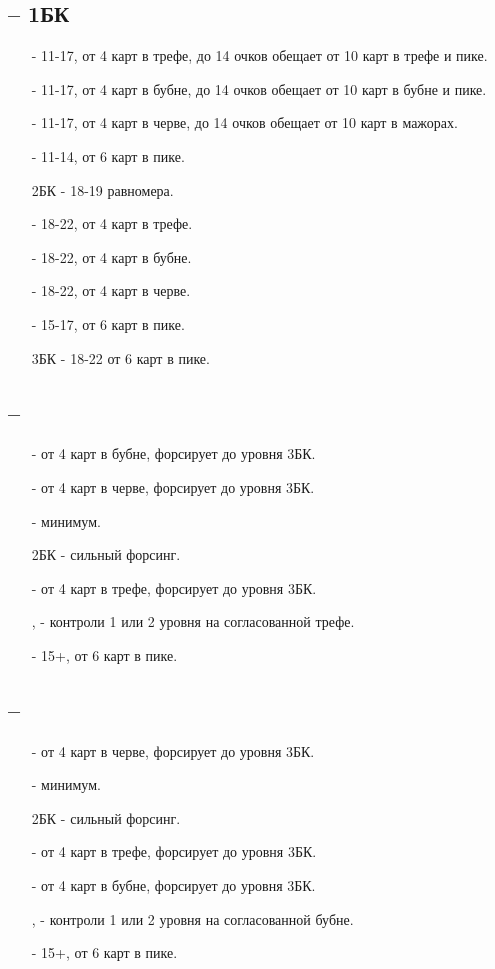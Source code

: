 \documentclass{article}
\begin{document}
\subsection{ -- 1БК}
\begin{enumerate}
    \item[\cl{2}] - 11-17, от 4 карт в трефе, до 14 очков обещает от 10 карт в трефе и пике. 
    \item[\di{2}] - 11-17, от 4 карт в бубне, до 14 очков обещает от 10 карт в бубне и пике. 
    \item[\he{2}] - 11-17, от 4 карт в черве, до 14 очков обещает от 10 карт в мажорах.
    \item[\sp{2}] - 11-14, от 6 карт в пике.
    \item[2БК] - 18-19 равномера.
    \item[\cl{3}] - 18-22, от 4 карт в трефе.
    \item[\di{3}] - 18-22, от 4 карт в бубне.
    \item[\he{3}] - 18-22, от 4 карт в черве.
    \item[\sp{3}] - 15-17, от 6 карт в пике.
    \item[3БК] - 18-22 от 6 карт в пике.
\end{enumerate}
\subsection{ -- }
\begin{enumerate} 
    \item[\di{2}] - от 4 карт в бубне, форсирует до уровня 3БК.
    \item[\he{2}] - от 4 карт в черве, форсирует до уровня 3БК.
    \item[\sp{2}] - минимум.
    \item[2БК] - сильный форсинг.
    \item[\cl{3}] - от 4 карт в трефе, форсирует до уровня 3БК.
    \item[\di{3}, \he{3}] - контроли 1 или 2 уровня на согласованной трефе.
    \item[\sp{3}] - 15+, от 6 карт в пике.
\end{enumerate}
\subsection{ -- }
\begin{enumerate} 
    \item[\he{2}] - от 4 карт в черве, форсирует до уровня 3БК.
    \item[\sp{2}] - минимум.
    \item[2БК] - сильный форсинг.
    \item[\cl{3}] - от 4 карт в трефе, форсирует до уровня 3БК.
    \item[\di{3}] - от 4 карт в бубне, форсирует до уровня 3БК.
    \item[\he{3}, \cl{4}] - контроли 1 или 2 уровня на согласованной бубне.
    \item[\sp{3}] - 15+, от 6 карт в пике.
\end{enumerate}
\end{document}
